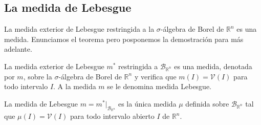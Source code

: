 \subsection{La medida de Lebesgue}
La medida exterior de Lebesgue restringida a la $\sigma$-álgebra de Borel de $\mathbb{R}^n$ es una medida. Enunciamos el teorema pero posponemos la demostración para más adelante.
\begin{teo}
La medida exterior de Lebesgue $m^*$ restringida a $\mathcal{B}_{\mathbb{R}^n}$ es una medida, denotada por $m$, sobre la $\sigma$-álgebra de Borel de $\mathbb{R}^n$ y verifica que $m(I) = \mathcal{V}(I)$ para todo intervalo $I$. A la medida $m$ se le denomina medida Lebesgue.
\end{teo}
\begin{teo}
La medida de Lebesgue $m = m^* |_{\mathcal{B}_{\mathbb{R}^n}}$ es la única medida $\mu$ definida sobre $\mathcal{B}_{\mathbb{R}^n}$ tal que $\mu(I) = \mathcal{V}(I)$ para todo intervalo abierto $I$ de $\mathbb{R}^n$.
\end{teo}
